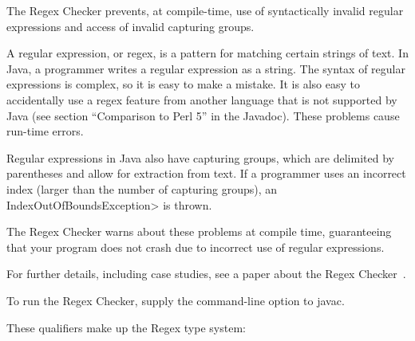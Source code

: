 \htmlhr
{}

The Regex Checker prevents, at compile-time, use of syntactically invalid
regular expressions and access of invalid capturing groups.

A regular expression, or regex, is a pattern for matching certain strings
of text.  In Java, a programmer writes a regular expression as a string.
The syntax of regular expressions is complex, so it is easy to make a
mistake.  It is also easy to accidentally use a regex feature from another
language that is not supported by Java (see section ``Comparison to Perl
5'' in the  Javadoc).
These problems cause run-time errors.

Regular expressions in Java also have capturing groups, which
are delimited by parentheses and allow for extraction from text.
If a programmer uses an incorrect index (larger than the number of
capturing groups), an \<IndexOutOfBoundsException> is thrown.

The Regex Checker warns about these problems at compile time, guaranteeing
that your program does not crash due to incorrect use of regular expressions.

For further details, including case studies, see a paper about the Regex
Checker~\cite{SpishakDE2012}.

To run the Regex Checker, supply the
command-line option to javac.



These qualifiers make up the Regex type system:

